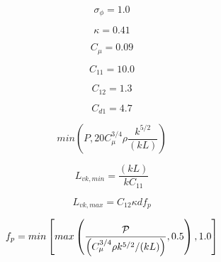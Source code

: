 {\newpage\clearpage
{}%
\begin{displaymath}
\sigma_{\phi} = 1.0
\end{displaymath}%
\lthtmldisplayZ
\lthtmlcheckvsize\clearpage}

{\newpage\clearpage
{}%
\begin{displaymath}
\kappa = 0.41
\end{displaymath}%
\lthtmldisplayZ
\lthtmlcheckvsize\clearpage}

{\newpage\clearpage
{}%
\begin{displaymath}
C_{\mu} = 0.09
\end{displaymath}%
\lthtmldisplayZ
\lthtmlcheckvsize\clearpage}

{\newpage\clearpage
{}%
\begin{displaymath}
C_{11} = 10.0
\end{displaymath}%
\lthtmldisplayZ
\lthtmlcheckvsize\clearpage}

{\newpage\clearpage
{}%
\begin{displaymath}
C_{12} = 1.3
\end{displaymath}%
\lthtmldisplayZ
\lthtmlcheckvsize\clearpage}

{\newpage\clearpage
{}%
\begin{displaymath}
C_{d1} = 4.7
\end{displaymath}%
\lthtmldisplayZ
\lthtmlcheckvsize\clearpage}

{\newpage\clearpage
{}%
\begin{displaymath}
min\left(P, 20 C_{\mu}^{3/4}\rho \frac{k^{5/2}}{(kL)}\right)
\end{displaymath}%
\lthtmldisplayZ
\lthtmlcheckvsize\clearpage}

{\newpage\clearpage
{}%
\begin{displaymath}
L_{vk,min}=\frac{(kL)}{k C_{11}}
\end{displaymath}%
\lthtmldisplayZ
\lthtmlcheckvsize\clearpage}

{\newpage\clearpage
{}%
\begin{displaymath}
L_{vk,max}=C_{12} \kappa d f_p
\end{displaymath}%
\lthtmldisplayZ
\lthtmlcheckvsize\clearpage}

{\newpage\clearpage
{}%
\begin{displaymath}
f_p=min\left[ max\left(\frac{\cal P}{\left(C_{\mu}^{3/4} \rho k^{5/2}/(kL) \right)}
 , 0.5 \right) , 1.0 \right]
\end{displaymath}%
\lthtmldisplayZ
\lthtmlcheckvsize\clearpage}

